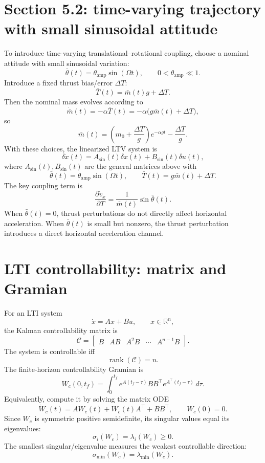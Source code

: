\documentclass[10pt]{article}
\newcommand{\R}{\mathbb{R}}
\newcommand{\dd}{\delta}
\newcommand{\thb}{\bar\theta}
\newcommand{\mb}{\bar m}
\newcommand{\Tb}{\bar T}
\newcommand{\vphi}{\alpha}
\begin{document}
\section{Section 5.2: time-varying trajectory with small sinusoidal attitude}
To introduce time-varying translational--rotational coupling, choose a nominal attitude with small sinusoidal variation:
\[
    \boxed{\thb(t)=\theta_{\mathrm{amp}}\sin(\Omega t)},
    \qquad
    0<\theta_{\mathrm{amp}}\ll 1.
\]
Introduce a fixed thrust bias/error $\Delta T$:
\[
    \boxed{\Tb(t)=\mb(t)g+\Delta T}.
\]
Then the nominal mass evolves according to
\[
    \dot{\mb}(t)=-\vphi\Tb(t)=-\vphi\bigl(g\mb(t)+\Delta T\bigr),
\]
so
\[
    \boxed{\mb(t)=\left(m_0+\frac{\Delta T}{g}\right)e^{-\vphi gt}-\frac{\Delta T}{g}}.
\]
With these choices, the linearized LTV system is
\[
    \boxed{\dd\dot x(t)=A_{\mathrm{sin}}(t)\dd x(t)+B_{\mathrm{sin}}(t)\dd u(t)},
\]
where $A_{\mathrm{sin}}(t),B_{\mathrm{sin}}(t)$ are the general matrices above with
\[
    \thb(t)=\theta_{\mathrm{amp}}\sin(\Omega t),
    \qquad
    \Tb(t)=g\mb(t)+\Delta T.
\]
The key coupling term is
\[
    \frac{\partial \dot v_x}{\partial T}
    =\frac{1}{\mb(t)}\sin\thb(t).
\]
When $\thb(t)=0$, thrust perturbations do not directly affect horizontal acceleration. When $\thb(t)$ is small but nonzero, the thrust perturbation introduces a direct horizontal acceleration channel.

\section{LTI controllability: matrix and Gramian}
For an LTI system
\[
    \dot x=Ax+Bu,
    \qquad x\in\R^n,
\]
the Kalman controllability matrix is
\[
    \boxed{\mathcal C=\begin{bmatrix}B&AB&A^2B&\cdots&A^{n-1}B\end{bmatrix}}.
\]
The system is controllable iff
\[
    \boxed{\operatorname{rank}(\mathcal C)=n}.
\]
The finite-horizon controllability Gramian is
\[
    \boxed{W_c(0,t_f)=\int_0^{t_f}e^{A(t_f-\tau)}BB^{\top}e^{A^{\top}(t_f-\tau)}\,d\tau}.
\]
Equivalently, compute it by solving the matrix ODE
\[
    \boxed{\dot W_c(t)=AW_c(t)+W_c(t)A^{\top}+BB^{\top},\qquad W_c(0)=0.}
\]
Since $W_c$ is symmetric positive semidefinite, its singular values equal its eigenvalues:
\[
    \sigma_i(W_c)=\lambda_i(W_c)\ge 0.
\]
The smallest singular/eigenvalue measures the weakest controllable direction:
\[
    \boxed{\sigma_{\min}(W_c)=\lambda_{\min}(W_c)}.
\]
\end{document}
